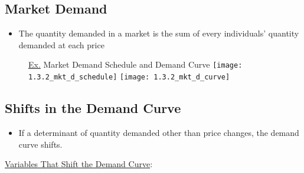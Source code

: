 \subsection{Market Demand}

	\begin{itemize}
	
	\item The quantity demanded in a market is the sum of every individuals' quantity demanded at each price
	
	\end{itemize}
	
	\begin{figure}[h]
	\underline{Ex.} Market Demand Schedule and Demand Curve
	\centering
	\texttt{[image: 1.3.2\_mkt\_d\_schedule]}
	\texttt{[image: 1.3.2\_mkt\_d\_curve]}
	\end{figure}
	
\subsection{Shifts in the Demand Curve}

	\begin{itemize}

	\item If a determinant of quantity demanded other than price changes, the demand curve shifts.

	\end{itemize}
	
	\underline{Variables That Shift the Demand Curve}:
	
